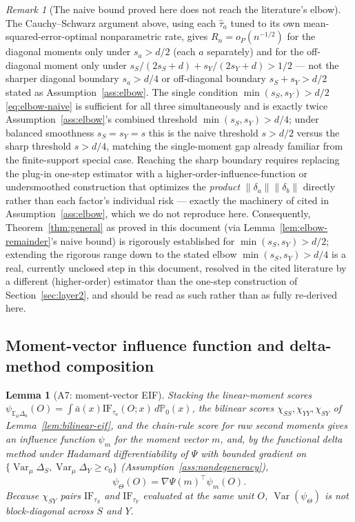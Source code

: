 \documentclass[11pt]{article}
\theoremstyle{plain}
\newtheorem{lemma}[theorem]{Lemma}
\theoremstyle{definition}
\theoremstyle{remark}
\newtheorem{remark}[theorem]{Remark}
\newcommand{\E}{\mathbb{E}}
\newcommand{\PP}{\mathbb{P}}
\newcommand{\IF}{\mathrm{IF}}
\DeclareMathOperator{\Var}{Var}
\begin{document}
\begin{remark}[The naive bound proved here does not reach the literature's elbow]\label{rem:elbow-gap}
The Cauchy--Schwarz argument above, using each $\hat\tau_a$ tuned to its own
mean-squared-error-optimal nonparametric rate, gives $R_n=o_P(n^{-1/2})$ for the
diagonal moments only under $s_a>d/2$ (each $a$ separately) and for the
off-diagonal moment only under $s_S/(2s_S+d)+s_Y/(2s_Y+d)>1/2$ --- not the sharper
diagonal boundary $s_a>d/4$ or off-diagonal boundary $s_S+s_Y>d/2$ stated as
Assumption~\ref{ass:elbow}. The single condition $\min(s_S,s_Y)>d/2$
\eqref{eq:elbow-naive} is sufficient for all three simultaneously and is exactly
twice Assumption~\ref{ass:elbow}'s combined threshold $\min(s_S,s_Y)>d/4$; under
balanced smoothness $s_S=s_Y=s$ this is the naive threshold $s>d/2$ versus the sharp
threshold $s>d/4$, matching the single-moment gap already familiar from the
finite-support special case. Reaching the sharp boundary requires replacing the
plug-in one-step estimator with a higher-order-influence-function or undersmoothed
construction that optimizes the \emph{product} $\|\delta_a\|\|\delta_b\|$ directly
rather than each factor's individual risk --- exactly the machinery of
\citet{Robins2008HOIF,Robins2017Minimax} cited in Assumption~\ref{ass:elbow}, which
we do not reproduce here. Consequently, Theorem~\ref{thm:general} as proved in this
document (via Lemma~\ref{lem:elbow-remainder}'s naive bound) is rigorously
established for $\min(s_S,s_Y)>d/2$; extending the rigorous range down to the stated
elbow $\min(s_S,s_Y)>d/4$ is a real, currently unclosed step in this document,
resolved in the cited literature by a different (higher-order) estimator than the
one-step construction of Section~\ref{sec:layer2}, and should be read as such rather
than as fully re-derived here.
\end{remark}

\subsection{Moment-vector influence function and delta-method composition}

\begin{lemma}[A7: moment-vector EIF]\label{lem:moment-eif}
Stacking the linear-moment scores
$\psi_{\E_\mu\Delta_a}(O)=\int\bar a(x)\IF_{\tau_a}(O;x)\,d\PP_0(x)$, the bilinear
scores $\chi_{SS},\chi_{YY},\chi_{SY}$ of Lemma~\ref{lem:bilinear-eif}, and the
chain-rule score for raw second moments gives an influence function $\psi_m$ for the
moment vector $m$, and, by the functional delta method under Hadamard
differentiability of $\Psi$ with bounded gradient on
$\{\Var_\mu\Delta_S,\Var_\mu\Delta_Y\ge c_0\}$ (Assumption~\ref{ass:nondegeneracy}),
\begin{equation}\label{eq:psi-theta-general}
    \psi_\Theta(O) = \nabla\Psi(m)^\top\psi_m(O).
\end{equation}
Because $\chi_{SY}$ pairs $\IF_{\tau_S}$ and $\IF_{\tau_Y}$ evaluated at the
\emph{same} unit $O$, $\Var(\psi_\Theta)$ is not block-diagonal across $S$ and $Y$.
\end{lemma}
\end{document}
